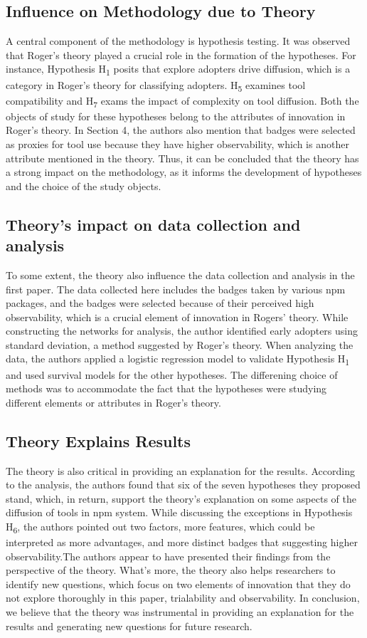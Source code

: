 \documentclass[journal,12pt,onecolumn,]{IEEEtran}
\begin{document}
\subsection{Influence on Methodology due to Theory}
A central component of the methodology is hypothesis testing. It was observed that Roger's theory played a crucial role in the formation of the hypotheses.
For instance, Hypothesis H\textsubscript{1}  posits that explore adopters drive diffusion, which is a category in Roger's theory for classifying adopters.
H\textsubscript{5} examines tool compatibility and H\textsubscript{7} exams the impact of complexity on tool diffusion. Both the objects of study for these hypotheses belong to the attributes of innovation in Roger's theory. 
In Section 4, the authors also mention that badges were selected as proxies for tool use because they have higher observability, which is another attribute mentioned in the theory.
Thus, it can be concluded that the theory has a strong impact on the methodology, as it informs the development of hypotheses and the choice of the study objects.

\subsection{Theory's impact on data collection and analysis}
To some extent, the theory also influence the data collection and analysis in the first paper. The data collected here includes the badges taken by various npm packages, and the badges were selected because of their perceived high observability, which is a crucial element of innovation in Rogers' theory.
While constructing the networks for analysis, the author identified early adopters using standard deviation, a method suggested by Roger's theory.
When analyzing the data, the authors applied a logistic regression model to validate Hypothesis H\textsubscript{1} and used survival models for the other hypotheses. The differening choice of methods was to accommodate the fact that the hypotheses were studying different elements or attributes in Roger's theory.
\subsection{Theory Explains Results}
The theory is also critical in providing an explanation for the results. According to the analysis, the authors found that six of the seven hypotheses they proposed
stand, which, in return, support the theory's explanation on some aspects of the diffusion of tools in npm system. While discussing the exceptions in Hypothesis H\textsubscript{6},
the authors pointed out two factors, more features, which could be interpreted as more advantages, and more distinct badges that suggesting higher observability.The authors appear to have presented their findings from the perspective of the theory.
What's more, the theory also helps researchers to identify new questions, which focus on two elements of innovation that they do not explore thoroughly in this paper, trialability and observability.
In conclusion, we believe that the theory was instrumental in providing an explanation for the results and generating new questions for future research.
\end{document}
